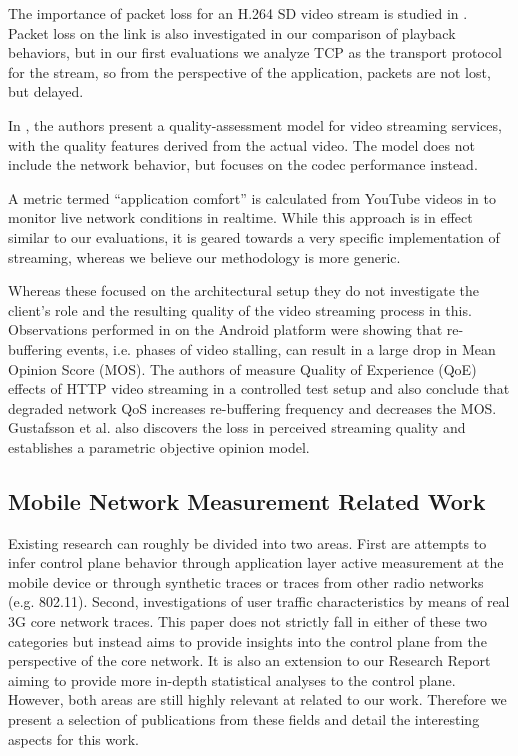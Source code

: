 The importance of packet loss for an H.264 SD video stream is studied in \cite{pv2010loss}. Packet loss on the link is also investigated in our comparison of playback behaviors, but in our first evaluations we analyze TCP as the transport protocol for the stream, so from the perspective of the application, packets are not lost, but delayed.


In \cite{pv2010qoe}, the authors present a quality-assessment model for video streaming services, with the quality features derived from the actual video. The model does not include the network behavior, but focuses on the codec performance instead. 

A metric termed ``application comfort'' is calculated from YouTube videos in \cite{staehle2010yomo} to monitor live network conditions in realtime. While this approach is in effect similar to our evaluations, it is geared towards a very specific implementation of streaming, whereas we believe our methodology is more generic.

Whereas these focused on the architectural setup they do not investigate the client's role and the resulting quality of the video streaming process in this. 
Observations performed in \cite{ketyko2010qoe} on the Android platform were showing that re-buffering events, i.e. phases of video stalling, can result in a large drop in Mean Opinion Score (MOS). The authors of \cite{mokmeasuring} measure Quality of Experience (QoE) effects of HTTP video streaming in a controlled test setup and also conclude that degraded network QoS increases re-buffering frequency and decreases the MOS. Gustafsson et al. \cite{gustafsson2008measmmmquality} also discovers the loss in perceived streaming quality and establishes a parametric objective opinion model.


\subsection{Mobile Network Measurement Related Work}

Existing research can roughly be divided into two areas. First are attempts to infer control plane behavior through application layer active measurement at the mobile device or through synthetic traces or traces from other radio networks (e.g. 802.11).
Second, investigations of user traffic characteristics by means of real 3G core network traces.
This paper does not strictly fall in either of these two categories but instead aims to provide insights into the control plane from the perspective of the core network. It is also an extension to our Research Report\cite{metzger2012research} aiming to provide more in-depth statistical analyses to the control plane.  
However, both areas are still highly relevant at related to our work. Therefore we present a selection of publications from these fields and detail the interesting aspects for this work.

